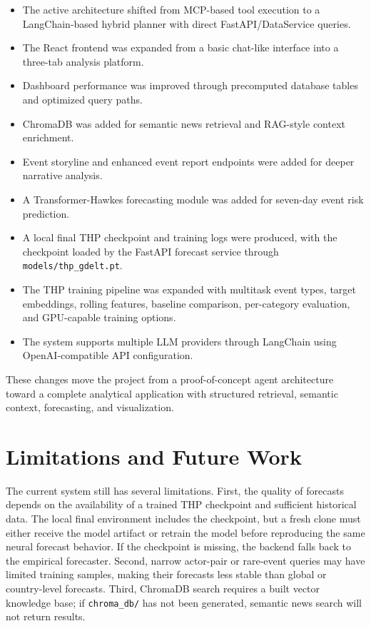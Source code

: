 \documentclass[11pt]{article}
\begin{document}
\begin{itemize}
    \item The active architecture shifted from MCP-based tool execution to a LangChain-based hybrid planner with direct FastAPI/DataService queries.
    \item The React frontend was expanded from a basic chat-like interface into a three-tab analysis platform.
    \item Dashboard performance was improved through precomputed database tables and optimized query paths.
    \item ChromaDB was added for semantic news retrieval and RAG-style context enrichment.
    \item Event storyline and enhanced event report endpoints were added for deeper narrative analysis.
    \item A Transformer-Hawkes forecasting module was added for seven-day event risk prediction.
    \item A local final THP checkpoint and training logs were produced, with the checkpoint loaded by the FastAPI forecast service through \texttt{models/thp\_gdelt.pt}.
    \item The THP training pipeline was expanded with multitask event types, target embeddings, rolling features, baseline comparison, per-category evaluation, and GPU-capable training options.
    \item The system supports multiple LLM providers through LangChain using OpenAI-compatible API configuration.
\end{itemize}

These changes move the project from a proof-of-concept agent architecture toward a complete analytical application with structured retrieval, semantic context, forecasting, and visualization.

\section{Limitations and Future Work}

The current system still has several limitations. First, the quality of forecasts depends on the availability of a trained THP checkpoint and sufficient historical data. The local final environment includes the checkpoint, but a fresh clone must either receive the model artifact or retrain the model before reproducing the same neural forecast behavior. If the checkpoint is missing, the backend falls back to the empirical forecaster. Second, narrow actor-pair or rare-event queries may have limited training samples, making their forecasts less stable than global or country-level forecasts. Third, ChromaDB search requires a built vector knowledge base; if \texttt{chroma\_db/} has not been generated, semantic news search will not return results.
\end{document}
